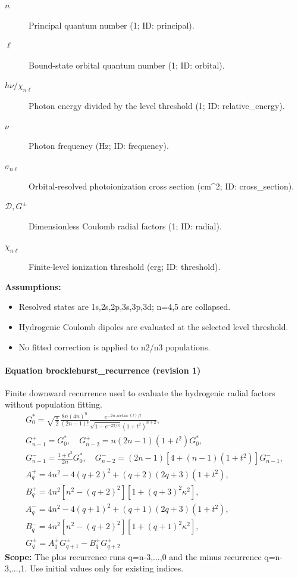 \begin{description}
\item[$n$] Principal quantum number (1; ID: principal).
\item[$\ell$] Bound-state orbital quantum number (1; ID: orbital).
\item[$h\nu/\chi_{n\ell}$] Photon energy divided by the level threshold (1; ID: relative\_energy).
\item[$\nu$] Photon frequency (Hz; ID: frequency).
\item[$\sigma_{n\ell}$] Orbital-resolved photoionization cross section (cm\textasciicircum{}2; ID: cross\_section).
\item[$\mathcal D,G^\pm$] Dimensionless Coulomb radial factors (1; ID: radial).
\item[$\chi_{n\ell}$] Finite-level ionization threshold (erg; ID: threshold).
\end{description}

\noindent\textbf{Assumptions:}
\begin{itemize}
\item Resolved states are 1s,2s,2p,3s,3p,3d; n=4,5 are collapsed.
\item Hydrogenic Coulomb dipoles are evaluated at the selected level threshold.
\item No fitted correction is applied to n2/n3 populations.
\end{itemize}

\paragraph{Equation brocklehurst\_recurrence (revision 1)}
Finite downward recurrence used to evaluate the hydrogenic radial factors without population fitting.
\begin{equation}
\begin{aligned}
G_0^*=\sqrt{\frac\pi2}\frac{8n(4n)^n}{(2n-1)!}
\frac{e^{-2n\arctan(t)/t}}{\sqrt{1-e^{-2\pi/\kappa}}(1+t^2)^{n+2}},\\
G^+_{n-1}=G_0^*,\quad G^+_{n-2}=n(2n-1)(1+t^2)G_0^*,\\
G^-_{n-1}=\frac{1+t^2}{2n}G_0^*,\quad
G^-_{n-2}=(2n-1)[4+(n-1)(1+t^2)]G^-_{n-1},\\
A_q^+=4n^2-4(q+2)^2+(q+2)(2q+3)(1+t^2),\\
B_q^+=4n^2[n^2-(q+2)^2][1+(q+3)^2\kappa^2],\\
A_q^-=4n^2-4(q+1)^2+(q+1)(2q+3)(1+t^2),\\
B_q^-=4n^2[n^2-(q+2)^2][1+(q+1)^2\kappa^2],\\
G_q^\pm=A_q^\pm G_{q+1}^\pm-B_q^\pm G_{q+2}^\pm
\end{aligned}
\label{eq:escape.cloudy_5f_investigation:brocklehurst_5f_recurrence:1}
\end{equation}
\noindent\textbf{Scope:} The plus recurrence runs q=n-3,...,0 and the minus recurrence q=n-3,...,1. Use initial values only for existing indices.

